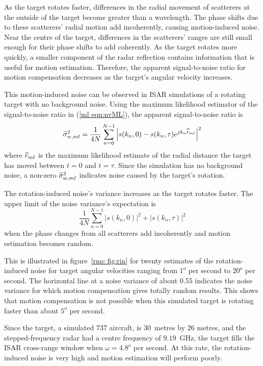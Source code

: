 As the target rotates faster, differences in the radial movement of
scatterers at the outside of the target become greater than a wavelength. 
The phase shifts due to these scatterers' radial motion add incoherently,
causing motion-induced noise.  Near the centre of the target, differences in
the scatterers' ranges are still small enough for their phase shifts to add
coherently.  As the target rotates more quickly, a smaller component of the
radar reflection contains information that is useful for motion estimation.
Therefore, the apparent signal-to-noise ratio for motion
compensation decreases as the target's angular velocity increases.

This motion-induced noise can be observed in ISAR simulations of a rotating 
target with no background noise.  Using the maximum likelihood estimator of
the signal-to-noise ratio in (\ref{ml eqn:nvML}), the apparent
signal-to-noise ratio is
\begin{equation}
\widehat{\sigma}^2_{{w},ml}=\frac{1}{4N}\sum_{n=0}^{N-1} 
\left|s(k_n,0)-s(k_n,\tau){e^{jk_n\widehat{r}_{ml}}}\right|^2
\end{equation}
where $\widehat{r}_{ml}$ is the maximum likelihood estimate of the radial distance the
target has moved between $t=0$ and $t=\tau$.  Since the simulation has no
background noise, a non-zero $\widehat{\sigma}^2_{{w},ml}$ indicates noise caused by the target's 
rotation.

The rotation-induced noise's variance increases as the target rotates
faster.  The upper limit of the noise variance's expectation is
\begin{equation}
\frac{1}{4N}\sum_{n=0}^{N-1}\left|s(k_n,0)\right|^2+\left|s(k_n,\tau)\right|^2
\end{equation}
when the phase changes from all scatterers add incoherently and motion
estimation becomes random.

This is illustrated in figure~\ref{rmc fig:rin} for twenty estimates of the
rotation-induced noise for target angular velocities ranging from $1^o$ per
second to $20^o$ per second.  The horizontal line at a noise variance
of about $0.55$ indicates the noise variance for which motion compensation 
gives totally random results.  This shows that motion compensation is not
possible when this simulated target is rotating faster than about
$5^o$ per second.

Since the target, a simulated 737 aircraft, is $30$~metres by $26$ metres, 
and the stepped-frequency radar had a centre frequency of $9.19$~GHz, the 
target fills the ISAR cross-range window when $\omega=4.8^o$ per 
second.  At this rate, the rotation-induced noise is very high and motion
estimation will perform poorly.

